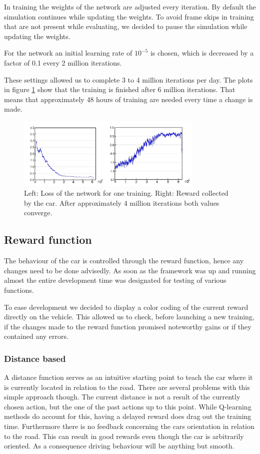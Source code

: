 In training the weights of the network are adjusted every iteration. By default the simulation continues while updating the weights. To avoid frame skips in training that are not present while evaluating, we decided to pause the simulation while updating the weights.

For the network an initial learning rate of $10^{-5}$ is chosen, which is decreased by a factor of 0.1 every 2 million iterations.

These settings allowed us to complete 3 to 4 million iterations per day. The plots in figure \ref{fig:lossandrew} show that the training is finished after 6 million iterations. That means that approximately 48 hours of training are needed every time a change is made.

\begin{figure}[!t]
\centering
\includegraphics[width=3.5in]{../presentation/both-plot.jpg} 
\caption{Left: Loss of the network for one training. Right: Reward collected by the car. After approximately 4 million iterations both values converge.}
\label{fig:lossandrew}
\end{figure}
 

\subsection{Reward function}
The behaviour of the car is controlled through the reward function, hence any changes need to be done advisedly. As soon as the framework was up and running almost the entire development time was designated for testing of various functions. 

To ease development we decided to display a color coding of the current reward directly on the vehicle. This allowed us to check, before launching a new training, if the changes made to the reward function promised noteworthy gains or if they contained any errors. 
\subsubsection{Distance based}
A distance function serves as an intuitive starting point to teach the car where it is currently located in relation to the road. There are several problems with this simple approach though. The current distance is not a result of the currently chosen action, but the one of the past actions up to this point. While Q-learning methods do account for this, having a delayed reward does drag out the training time. Furthermore there is no feedback concerning the cars orientation in relation to the road. This can result in good rewards even though the car is arbitrarily oriented. As a consequence driving behaviour will be anything but smooth.
